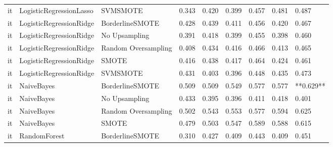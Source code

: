 \begin{tabular}{lllllllll}
      it &      LogisticRegressionLasso &            SVMSMOTE & 0.343 &                     0.420 &                 0.399 &                  0.457 &                                   0.481 &     0.487 \\
      it &      LogisticRegressionRidge &     BorderlineSMOTE & 0.428 &                     0.439 &                 0.411 &                  0.456 &                                   0.420 &     0.467 \\
      it &      LogisticRegressionRidge &       No Upsampling & 0.391 &                     0.418 &                 0.399 &                  0.455 &                                   0.398 &     0.460 \\
      it &      LogisticRegressionRidge & Random Oversampling & 0.408 &                     0.434 &                 0.416 &                  0.466 &                                   0.413 &     0.465 \\
      it &      LogisticRegressionRidge &               SMOTE & 0.416 &                     0.438 &                 0.417 &                  0.464 &                                   0.424 &     0.461 \\
      it &      LogisticRegressionRidge &            SVMSMOTE & 0.431 &                     0.403 &                 0.396 &                  0.448 &                                   0.435 &     0.473 \\
      it &                   NaiveBayes &     BorderlineSMOTE & 0.509 &                     0.509 &                 0.549 &                  0.577 &                                   0.577 & **0.629** \\
      it &                   NaiveBayes &       No Upsampling & 0.433 &                     0.395 &                 0.396 &                  0.411 &                                   0.418 &     0.401 \\
      it &                   NaiveBayes & Random Oversampling & 0.502 &                     0.543 &                 0.553 &                  0.577 &                                   0.594 &     0.625 \\
      it &                   NaiveBayes &               SMOTE & 0.479 &                     0.503 &                 0.547 &                  0.589 &                                   0.588 &     0.615 \\
      it &                 RandomForest &     BorderlineSMOTE & 0.310 &                     0.427 &                 0.409 &                  0.443 &                                   0.409 &     0.451 \\

\end{tabular}
